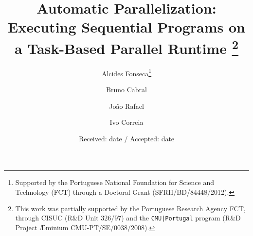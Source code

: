 \documentclass[smallextended]{svjour3}
\begin{document}
\title{Automatic Parallelization: Executing Sequential Programs on a Task-Based Parallel Runtime
\thanks{This work was partially supported by the Portuguese Research Agency FCT, through CISUC (R\&D Unit 326/97) and the \texttt{CMU|Portugal} program (R\&D Project Æminium CMU-PT/SE/0038/2008). }}



\author{Alcides Fonseca\thanks{Supported by the Portuguese National Foundation for Science and Technology (FCT) through a Doctoral Grant (SFRH/BD/84448/2012).}     
\and Bruno Cabral
\and João Rafael
\and Ivo Correia
}


\date{Received: date / Accepted: date}


\maketitle
\end{document}
